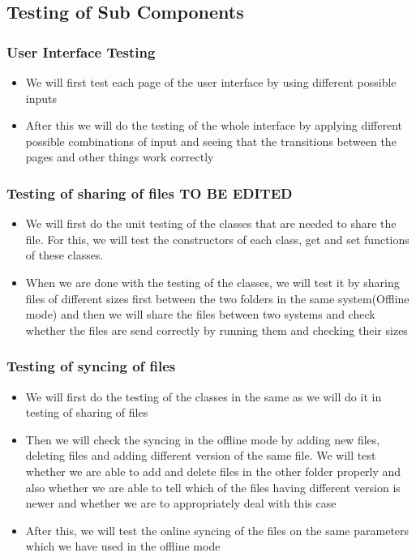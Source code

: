 \documentclass{article}
\begin{document}
\subsection{Testing of Sub Components}
\subsubsection{User Interface Testing}
\begin{itemize}
\item We will first test each page of the user interface by using different possible inputs
\item After this we will do the testing of the whole interface by applying different possible combinations of input and seeing that the transitions between the pages and other things work correctly
\end{itemize}
\subsubsection{Testing of sharing of files TO BE EDITED}
\begin{itemize}
\item We will first do the unit testing of the classes that are needed to share the file. For this, we will test the constructors of each class, get and set functions of these classes.
\item When we are done with the testing of the classes, we will test it by sharing files of different sizes first between the two folders in the same system(Offline mode) and then we will share the files between two systems and check whether the files are send correctly by running them and checking their sizes
\end{itemize}
\subsubsection{Testing of syncing of files}
\begin{itemize}
\item We will first do the testing of the classes in the same as we will do it in testing of sharing of files
\item Then we will check the syncing in the offline mode by adding new files, deleting files and adding different version of the same file. We will test whether we are able to add and delete files in the other folder properly and also whether we are able to tell which of the files having different version is newer and whether we are to appropriately deal with this case
\item After this, we will test the online syncing of the files on the same parameters which we have used in the offline mode
\end{itemize}
\end{document}
